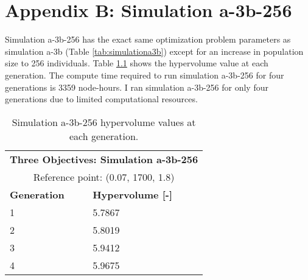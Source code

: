 \chapter{Appendix B: Simulation a-3b-256} 

Simulation a-3b-256 has the exact same optimization problem parameters as simulation 
a-3b (Table \ref{tab:simulationa3b}) except for an increase in population size to 256
individuals. 
Table \ref{tab:a3b-256-hypervolume} shows the hypervolume value at each generation.
The compute time required to run simulation a-3b-256 for four generations is 3359 
node-hours. 
I ran simulation a-3b-256 for only four generations due to limited computational 
resources.  
\begin{table}[htbp!]
    \centering
    \onehalfspacing
    \caption{Simulation a-3b-256 hypervolume values at each generation.}
	\label{tab:a3b-256-hypervolume}
    \footnotesize
    \begin{tabular}{ll}
    \hline 
    \multicolumn{2}{c}{\textbf{Three Objectives: Simulation a-3b-256}} \\
    \multicolumn{2}{c}{Reference point: (0.07, 1700, 1.8)} \\
    \hline 
    \textbf{Generation} & \textbf{Hypervolume [-]} \\
    \hline
    1 & 5.7867 \\
    2 & 5.8019 \\
    3 & 5.9412 \\
    4 & 5.9675 \\
    \hline
    \end{tabular}
\end{table}

